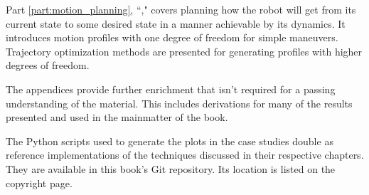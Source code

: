 Part \ref{part:motion_planning}, ``," covers
planning how the robot will get from its current state to some desired state in
a manner achievable by its dynamics. It introduces motion profiles with one
degree of freedom for simple maneuvers. Trajectory optimization methods are
presented for generating profiles with higher degrees of freedom.

The appendices provide further enrichment that isn't required for a passing
understanding of the material. This includes derivations for many of the results
presented and used in the mainmatter of the book.

The Python scripts used to generate the plots in the case studies double as
reference implementations of the techniques discussed in their respective
chapters. They are available in this book's Git repository. Its location is
listed on the copyright page.
